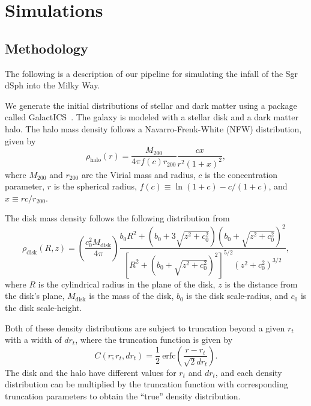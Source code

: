 \chapter{Simulations}
\label{sec:sim}

\section{Methodology}
The following is a description of our pipeline for simulating the infall of the
Sgr dSph into the Milky Way. 

We generate the initial distributions of stellar and dark matter using a package
called GalactICS~\cite{deg_galactics_2019}. The galaxy is modeled with a
stellar disk and a dark matter halo. The halo mass density follows a
Navarro-Frenk-White (NFW) distribution,~\cite{wang_equilibrium_2010} given by
\begin{equation} \label{eq:halo_dist}
    \rho_{\text{halo}}(r) 
    = \frac{M_{200}}{4\pi f(c) r_{200}} \frac{cx}{r^2 (1+x)^2},
\end{equation}
where $M_{200}$ and $r_{200}$ are the Virial mass and radius, $c$ is the
concentration parameter, $r$ is the spherical radius, $f(c) \equiv \ln(1+c) -
c/(1+c)$, and $x \equiv rc/r_{200}$.

The disk mass density follows the following distribution
from~\cite{wang_equilibrium_2010}
\begin{equation} \label{eq:disk_dist}
    \rho_{\text{disk}}(R, z)
    = \left( \frac{c_0^2 M_{\text{disk}}}{4\pi} \right)
    \frac{
        b_0 R^2 + (b_0 + 3 \sqrt{z^2 + c_0^2})(b_0 + \sqrt{z^2 + c_0^2})^2
    }{
        \left[ R^2 + (b_0 + \sqrt{z^2 + c_0^2})^2 \right]^{5/2}
        (z^2 + c_0^2)^{3/2}
    },
\end{equation}
where $R$ is the cylindrical radius in the plane of the disk, $z$ is the
distance from the disk's plane, $M_{\text{disk}}$ is the mass of the disk, $b_0$
is the disk scale-radius, and $c_0$ is the disk scale-height.

Both of these density distributions are subject to truncation beyond a given
$r_{t}$ with a width of $dr_t$, where the truncation function is given
by~\cite{widrow_dynamical_2008}
\begin{equation} \label{eq:trunc}
    C(r; r_t, dr_t)
    = \frac{1}{2}\ \text{erfc} \left( \frac{r - r_t}{\sqrt{2}
    dr_t} \right).
\end{equation}
The disk and the halo have different values for $r_t$ and $dr_t$, and each
density distribution can be multiplied by the truncation function with
corresponding truncation parameters to obtain the ``true'' density distribution.


